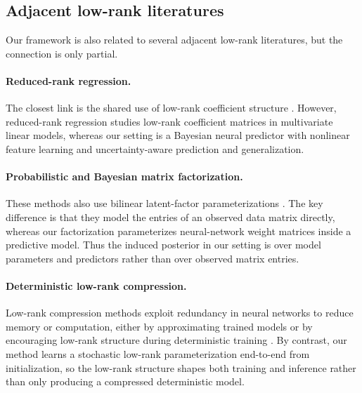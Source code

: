 \documentclass{article}
\theoremstyle{plain}
\theoremstyle{definition}
\theoremstyle{remark}
\begin{document}
\subsection{Adjacent low-rank literatures}

Our framework is also related to several adjacent low-rank literatures, but the
connection is only partial.

\paragraph{Reduced-rank regression.}
The closest link is the shared use of low-rank coefficient structure
\citep{izenman1975reduced,reinsel1998multivariate}. However,
reduced-rank regression studies low-rank coefficient matrices in multivariate
linear models, whereas our setting is a Bayesian neural predictor with nonlinear
feature learning and uncertainty-aware prediction and generalization.

\paragraph{Probabilistic and Bayesian matrix factorization.}
These methods also use bilinear latent-factor parameterizations
\citep{mnih2007probabilistic,salakhutdinov2008bayesian}. The key difference is that they model
the entries of an observed data matrix directly, whereas our factorization
parameterizes neural-network weight matrices inside a predictive model. Thus the
induced posterior in our setting is over model parameters and predictors rather
than over observed matrix entries.

\paragraph{Deterministic low-rank compression.}
Low-rank compression methods exploit redundancy in neural networks to reduce
memory or computation, either by approximating trained models or by encouraging
low-rank structure during deterministic training
\citep{denton2014exploiting,alvarez2017compression}. By contrast, our method
learns a stochastic low-rank parameterization end-to-end from initialization, so
the low-rank structure shapes both training and inference rather than only
producing a compressed deterministic model.
\end{document}
